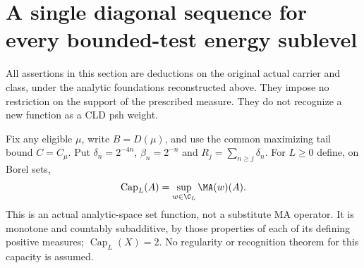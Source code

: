 \section{A single diagonal sequence for every bounded-test energy sublevel}
All assertions in this section are deductions on the original actual
carrier and class, under the analytic foundations reconstructed above.
They impose no restriction on the support of the prescribed measure.
They do not recognize a new function as a CLD psh weight.

Fix any eligible $\mu$, write $B=D(\mu)$, and use the common maximizing
tail bound $C=C_\mu$. Put $\delta_n=2^{-4n}$, $\beta_n=2^{-n}$ and
$R_j=\sum_{n\ge j}\delta_n$. For $L\ge0$ define, on Borel sets,
\[
 \operatorname{Cap}_L(A)=\sup_{w\in\C_L}\MA(w)(A).
\]
This is an actual analytic-space set function, not a substitute MA
operator. It is monotone and countably subadditive, by those properties
of each of its defining positive measures; $\operatorname{Cap}_L(X)=2$.
No regularity or recognition theorem for this capacity is assumed.

